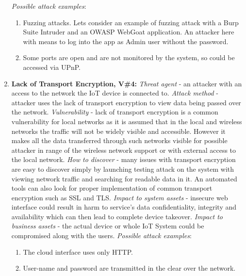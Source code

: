 \documentclass[12pt]{article}
\begin{document}
\begin{enumerate}
		\newline \textit{Possible attack examples}:
			\begin{enumerate}[label=(\roman*)]
				\item Fuzzing attacks. Lets consider an example of fuzzing attack with a Burp Suite Intruder and an OWASP WebGoat application. An attacker here with means to log into the app as Admin user
				without the password.
				\item Some ports are open and are not monitored by the system, so could be accessed via UPnP.
			\end{enumerate}
	\item \textbf{Lack of Transport Encryption, V\#4:}
		\newline \textit{Threat agent} - an attacker with an access to the network the IoT device is connected to.
		\newline \textit{Attack method} - attacker uses the lack of transport encryption to view data being passed over the network.
		\newline \textit{Vulnerability} - lack of transport encryption is a common vulnerability for local networks as it is assumed that in the local and wireless networks the traffic will not be widely visible and accessible. However it makes all the data transferred through such networks visible for possible attacker in range of the wireless network support or with external access to the local network.
		\newline \textit{How to discover} - many issues with transport encryption are easy to discover simply by launching testing attack on the system with viewing network traffic and searching for readable data in it. An automated tools can also look for proper implementation of common transport encryption such as SSL and TLS.
		\newline \textit{Impact to system assets} - insecure web interface could result in harm to service’s data confidentiality, integrity and availability which can then lead to complete device takeover.
		\newline \textit{Impact to business assets} - the actual device or whole IoT System could be compromised along with the users.
		\newline \textit{Possible attack examples}:
			\begin{enumerate}[label=(\roman*)]
				\item The cloud interface uses only HTTP.
				\item User-name and password are transmitted in the clear over the network.

\end{enumerate}
\end{enumerate}
\end{document}
